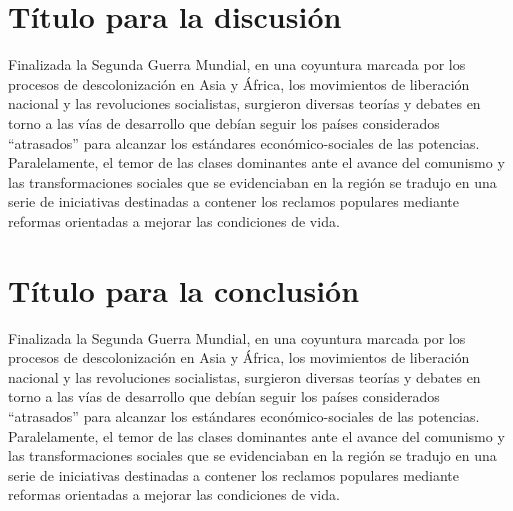 \section{Título para la discusión}
Finalizada la Segunda Guerra Mundial, en una coyuntura marcada por los procesos de descolonización en Asia y África, los movimientos de liberación nacional y las revoluciones socialistas, surgieron diversas teorías y debates en torno a las vías de desarrollo que debían seguir los países considerados “atrasados” para alcanzar los estándares económico-sociales de las potencias. Paralelamente, el temor de las clases dominantes ante el avance del comunismo y las transformaciones sociales que se evidenciaban en la región se tradujo en una serie de iniciativas destinadas a contener los reclamos populares mediante reformas orientadas a mejorar las condiciones de vida.


\section{Título para la conclusión}
Finalizada la Segunda Guerra Mundial, en una coyuntura marcada por los procesos de descolonización en Asia y África, los movimientos de liberación nacional y las revoluciones socialistas, surgieron diversas teorías y debates en torno a las vías de desarrollo que debían seguir los países considerados “atrasados” para alcanzar los estándares económico-sociales de las potencias. Paralelamente, el temor de las clases dominantes ante el avance del comunismo y las transformaciones sociales que se evidenciaban en la región se tradujo en una serie de iniciativas destinadas a contener los reclamos populares mediante reformas orientadas a mejorar las condiciones de vida.


